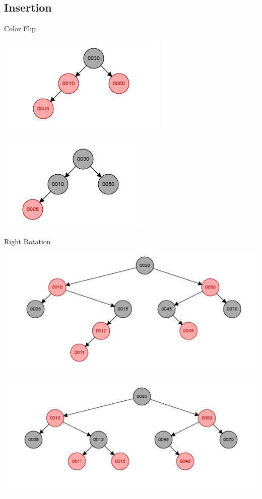 \documentclass{beamer}
\begin{document}
\subsection{Insertion}
\begin{frame}{Color Flip}

\begin{left}
\includegraphics[scale=0.6]{RECOLOR1.png}
\end{left}
\begin{right}
\includegraphics[scale=0.7]{RECOLOR2.png}
\end{right}

\end{frame}

\begin{frame}{Right Rotation}
\begin{left}
\includegraphics[scale=0.5]{LL1.png}
\end{left}
\begin{right}
\includegraphics[scale=0.5]{LL2.png}
\end{right}
\end{frame}
\end{document}
